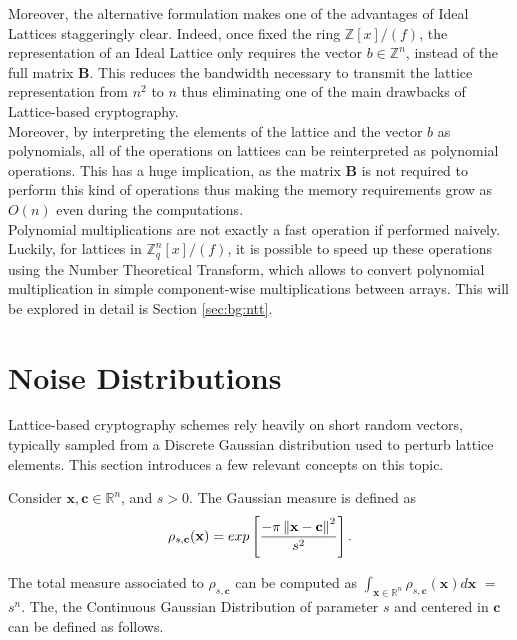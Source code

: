 Moreover, the alternative formulation makes one of the advantages of Ideal Lattices staggeringly clear. Indeed, once fixed the ring $\mathbb{Z}[x]/(f)$, the representation of an Ideal Lattice only requires the vector $b\in\mathbb{Z}^n$, instead of the full matrix $\mathbf{B}$. This reduces the bandwidth necessary to transmit the lattice representation from $n^2$ to $n$ thus eliminating one of the main drawbacks of Lattice-based cryptography.\\
Moreover, by interpreting the elements of the lattice and the vector $b$ as polynomials, all of the operations on lattices can be reinterpreted as polynomial operations. This has a huge implication, as the matrix $\mathbf{B}$ is not required to perform this kind of operations thus making the memory requirements grow as $O(n)$ even during the computations.\\
Polynomial multiplications are not exactly a fast operation if performed naively. Luckily, for lattices in $\mathbb{Z}_q^n[x]/(f)$, it is possible to speed up these operations using the Number Theoretical Transform, which allows to convert polynomial multiplication in simple component-wise multiplications between arrays. This will be explored in detail is Section \ref{sec:bg:ntt}.

\section{Noise Distributions}
Lattice-based cryptography schemes rely heavily on short random vectors, typically sampled from a Discrete Gaussian distribution used to perturb lattice elements. This section introduces a few relevant concepts on this topic.\\

\begin{definition}
Consider $\mathbf{x},\mathbf{c}\in\mathbb{R}^n$, and $s>0$. The Gaussian measure is defined as
\begin{equation*}
\rho_{s,\mathbf{c}}(\mathbf{x}) = exp\left[\frac{-\pi\left\lVert \mathbf{x}-\mathbf{c} \right\rVert^2}{s^2}\right].
\end{equation*}
\end{definition}

The total measure associated to $\rho_{s,\mathbf{c}}$ can be computed as $\int_{\mathbf{x}\in\mathbb{R}^n}\rho_{s,\mathbf{c}}(\mathbf{x})d\mathbf{x}$ $=$ $s^n$. The, the Continuous Gaussian Distribution of parameter $s$ and centered in $\mathbf{c}$ can be defined as follows.

